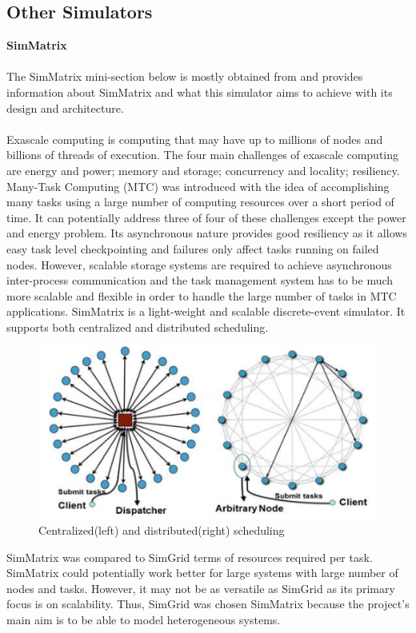 \documentclass[a4paper,11pt]{article}
\begin{document}
\subsection{Other Simulators}
\textbf{SimMatrix}
\\\\
The SimMatrix mini-section below is mostly obtained from \cite{simmatrix} and provides information about SimMatrix and what this simulator aims to achieve with its design and architecture.
\\\\
Exascale computing is computing that may have up to millions of nodes and billions of threads of execution. The four main challenges of exascale computing are energy and power; memory and storage; concurrency and locality; resiliency. Many-Task Computing (MTC) was introduced with the idea of accomplishing many tasks using a large number of computing resources over a short period of time. It can potentially address three of four of these challenges except the power and energy problem. Its asynchronous nature provides good resiliency as it allows easy task level checkpointing and failures only affect tasks running on failed nodes. However, scalable storage systems are required to achieve asynchronous inter-process communication and the task management system has to be much more scalable and flexible in order to handle the large number of tasks in MTC applications. SimMatrix is a light-weight and scalable discrete-event simulator. It supports both centralized and distributed scheduling.

\begin{figure}[H]
	\centering
	\includegraphics[scale=1.1]{images/scheduling}
	\caption{Centralized(left) and distributed(right) scheduling\cite{simmatrix}}
\end{figure}

\noindent SimMatrix was compared to SimGrid terms of resources required per task. SimMatrix could potentially work better for large systems with large number of nodes and tasks. However, it may not be as versatile as SimGrid as its primary focus is on scalability. Thus, SimGrid was chosen SimMatrix because the project's main aim is to be able to model heterogeneous systems. 
\end{document}
